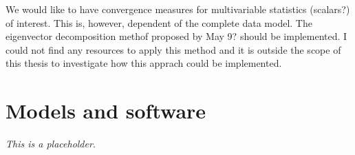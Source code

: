 \documentclass[article]{jss}
\begin{document}
We would like to have convergence measures for multivariable statistics (scalars?) of interest. This is, however, dependent of the complete data model. The eigenvector decomposition methof proposed by May 9? should be implemented. I could not find any resources to apply this method and it is outside the scope of this thesis to investigate how this apprach could be implemented.



\section{Models and software} \label{sec:models}

\emph{This is a placeholder.}



\end{document}
